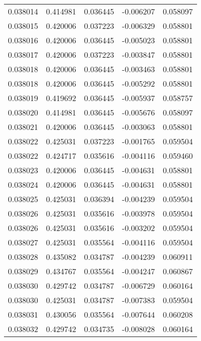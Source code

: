 \begin{tabular}{lrrrr}
0.038014    &  0.414981 &  0.036445 & -0.006207 &             0.058097 \\
0.038015    &  0.420006 &  0.037223 & -0.006329 &             0.058801 \\
0.038016    &  0.420006 &  0.036445 & -0.005023 &             0.058801 \\
0.038017    &  0.420006 &  0.037223 & -0.003847 &             0.058801 \\
0.038018    &  0.420006 &  0.036445 & -0.003463 &             0.058801 \\
0.038018    &  0.420006 &  0.036445 & -0.005292 &             0.058801 \\
0.038019    &  0.419692 &  0.036445 & -0.005937 &             0.058757 \\
0.038020    &  0.414981 &  0.036445 & -0.005676 &             0.058097 \\
0.038021    &  0.420006 &  0.036445 & -0.003063 &             0.058801 \\
0.038022    &  0.425031 &  0.037223 & -0.001765 &             0.059504 \\
0.038022    &  0.424717 &  0.035616 & -0.004116 &             0.059460 \\
0.038023    &  0.420006 &  0.036445 & -0.004631 &             0.058801 \\
0.038024    &  0.420006 &  0.036445 & -0.004631 &             0.058801 \\
0.038025    &  0.425031 &  0.036394 & -0.004239 &             0.059504 \\
0.038026    &  0.425031 &  0.035616 & -0.003978 &             0.059504 \\
0.038026    &  0.425031 &  0.035616 & -0.003202 &             0.059504 \\
0.038027    &  0.425031 &  0.035564 & -0.004116 &             0.059504 \\
0.038028    &  0.435082 &  0.034787 & -0.004239 &             0.060911 \\
0.038029    &  0.434767 &  0.035564 & -0.004247 &             0.060867 \\
0.038030    &  0.429742 &  0.034787 & -0.006729 &             0.060164 \\
0.038030    &  0.425031 &  0.034787 & -0.007383 &             0.059504 \\
0.038031    &  0.430056 &  0.035564 & -0.007644 &             0.060208 \\
0.038032    &  0.429742 &  0.034735 & -0.008028 &             0.060164 \\

\end{tabular}
